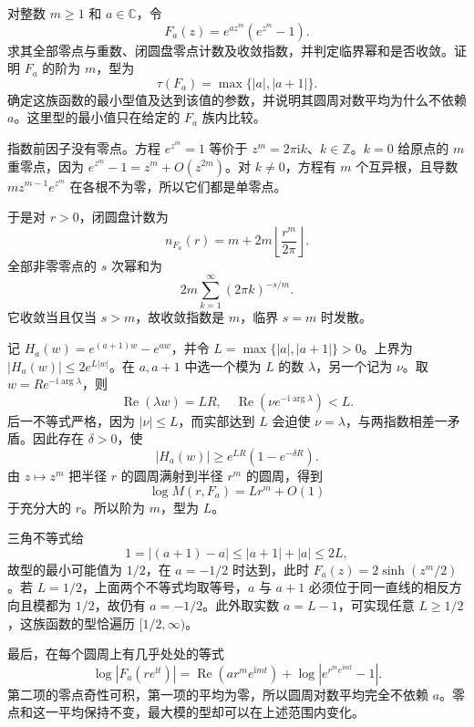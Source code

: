 \begin{exercise}[同一组零点与可变的型]\label{b3:ex:19-draft-05}
对整数 \(m\ge1\) 和 \(a\in\mathbb C\)，令
\[
 F_a(z)=e^{az^m}(e^{z^m}-1).
\]
求其全部零点与重数、闭圆盘零点计数及收敛指数，并判定临界幂和是否收敛。证明 \(F_a\) 的阶为 \(m\)，型为
\[
 \tau(F_a)=\max\{|a|,|a+1|\}.
\]
确定这族函数的最小型值及达到该值的参数，并说明其圆周对数平均为什么不依赖 \(a\)。这里型的最小值只在给定的 \(F_a\) 族内比较。
\end{exercise}
\begin{solution}
指数前因子没有零点。方程 \(e^{z^m}=1\) 等价于 \(z^m=2\pi\mathrm i k\)、\(k\in\mathbb Z\)。\(k=0\) 给原点的 \(m\) 重零点，因为 \(e^{z^m}-1=z^m+O(z^{2m})\)。对 \(k\ne0\)，方程有 \(m\) 个互异根，且导数 \(mz^{m-1}e^{z^m}\) 在各根不为零，所以它们都是单零点。

于是对 \(r>0\)，闭圆盘计数为
\[
 n_{F_a}(r)=m+2m\left\lfloor\frac{r^m}{2\pi}\right\rfloor.
\]
全部非零零点的 \(s\) 次幂和为
\[
 2m\sum_{k=1}^\infty(2\pi k)^{-s/m}.
\]
它收敛当且仅当 \(s>m\)，故收敛指数是 \(m\)，临界 \(s=m\) 时发散。

记 \(H_a(w)=e^{(a+1)w}-e^{aw}\)，并令 \(L=\max\{|a|,|a+1|\}>0\)。上界为 \(|H_a(w)|\le2e^{L|w|}\)。在 \(a,a+1\) 中选一个模为 \(L\) 的数 \(\lambda\)，另一个记为 \(\nu\)。取 \(w=Re^{-\mathrm i\arg\lambda}\)，则
\[
 \operatorname{Re}(\lambda w)=LR,\quad
 \operatorname{Re}(\nu e^{-\mathrm i\arg\lambda})<L.
\]
后一不等式严格，因为 \(|\nu|\le L\)，而实部达到 \(L\) 会迫使 \(\nu=\lambda\)，与两指数相差一矛盾。因此存在 \(\delta>0\)，使
\[
 |H_a(w)|\ge e^{LR}(1-e^{-\delta R}).
\]
由 \(z\mapsto z^m\) 把半径 \(r\) 的圆周满射到半径 \(r^m\) 的圆周，得到
\[
 \log M(r,F_a)=Lr^m+O(1)
\]
于充分大的 \(r\)。所以阶为 \(m\)，型为 \(L\)。

三角不等式给
\[
 1=|(a+1)-a|\le|a+1|+|a|\le2L,
\]
故型的最小可能值为 \(1/2\)，在 \(a=-1/2\) 时达到，此时 \(F_a(z)=2\sinh(z^m/2)\)。若 \(L=1/2\)，上面两个不等式均取等号，\(a\) 与 \(a+1\) 必须位于同一直线的相反方向且模都为 \(1/2\)，故仍有 \(a=-1/2\)。此外取实数 \(a=L-1\)，可实现任意 \(L\ge1/2\)，这族函数的型恰遍历 \([1/2,\infty)\)。

最后，在每个圆周上有几乎处处的等式
\[
 \log|F_a(re^{\mathrm it})|
 =\operatorname{Re}(ar^me^{\mathrm imt})+\log|e^{r^me^{\mathrm imt}}-1|.
\]
第二项的零点奇性可积，第一项的平均为零，所以圆周对数平均完全不依赖 \(a\)。零点和这一平均保持不变，最大模的型却可以在上述范围内变化。
\end{solution}

